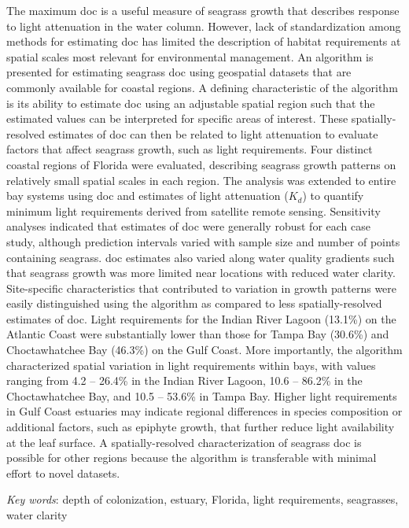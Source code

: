 \documentclass[letterpaper,12pt,oneside]{article}\usepackage[]{graphicx}\usepackage[]{color}
\begin{document}
The maximum \ac{doc} is a useful measure of seagrass growth that describes response to light attenuation in the water column.  However, lack of standardization among methods for estimating \ac{doc} has limited the description of habitat requirements at spatial scales most relevant for environmental management.  An algorithm is presented for estimating seagrass \ac{doc} using geospatial datasets that are commonly available for coastal regions.  A defining characteristic of the algorithm is its ability to estimate \ac{doc} using an adjustable spatial region such that the estimated values can be interpreted for specific areas of interest.  These spatially-resolved estimates of \ac{doc} can then be related to light attenuation to evaluate factors that affect seagrass growth, such as light requirements.  Four distinct coastal regions of Florida were evaluated, describing seagrass growth patterns on relatively small spatial scales in each region.  The analysis was extended to entire bay systems using \ac{doc} and estimates of light attenuation ($K_{d}$) to quantify minimum light requirements derived from satellite remote sensing.  Sensitivity analyses indicated that estimates of \ac{doc} were generally robust for each case study, although prediction intervals varied with sample size and number of points containing seagrass.  \ac{doc} estimates also varied along water quality gradients such that seagrass growth was more limited near locations with reduced water clarity. Site-specific characteristics that contributed to variation in growth patterns were easily distinguished using the algorithm as compared to less spatially-resolved estimates of \ac{doc}.  Light requirements for the Indian River Lagoon (13.1\%) on the Atlantic Coast were substantially lower than those for Tampa Bay (30.6\%) and Choctawhatchee Bay (46.3\%) on the Gulf Coast.  More importantly, the algorithm characterized spatial variation in light requirements within bays, with values ranging from 4.2 -- 26.4\% in the Indian River Lagoon, 10.6 -- 86.2\% in the Choctawhatchee Bay, and 10.5 -- 53.6\% in Tampa Bay.  Higher light requirements in Gulf Coast estuaries may indicate regional differences in species composition or additional factors, such as epiphyte growth, that further reduce light availability at the leaf surface.  A spatially-resolved characterization of seagrass \ac{doc} is possible for other regions because the algorithm is transferable with minimal effort to novel datasets.

\noindent \textit{Key words}: depth of colonization, estuary, Florida, light requirements, seagrasses, water clarity
\end{document}
